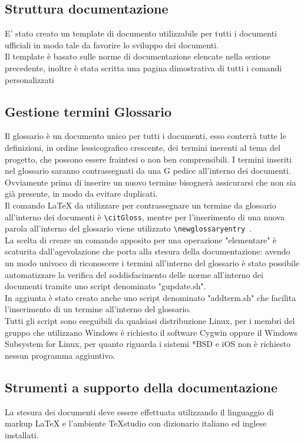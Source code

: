 \documentclass[NormeDiProgetto.tex]{subfiles}
\begin{document}
	\subsection{Struttura documentazione}
	E' stato creato un template di documento utilizzabile per tutti i documenti ufficiali in modo tale da favorire lo sviluppo dei documenti.\\
	Il template è basato sulle norme di documentazione elencate nella sezione precedente, inoltre è stata scritta una pagina dimostrativa di tutti i comandi personalizzati
	
	\subsection{Gestione termini Glossario}
	Il glossario è un documento unico per tutti i documenti, esso conterrà tutte le definizioni, in ordine lessicografico crescente, dei termini inerenti al tema del progetto, che possono essere fraintesi o non ben comprensibili. I termini inseriti nel glossario saranno contrassegnati da una G pedice all'interno dei documenti.\\
	Ovviamente prima di inserire un nuovo termine bisognerà assicurarsi che non sia già presente, in modo da evitare duplicati. \\
	Il comando \LaTeX{}  da utilizzare per contrassegnare un termine da glossario all'interno dei documenti è \texttt{\textbackslash{}citGloss}, mentre per l'inserimento di una nuova parola all'interno del glossario viene utilizzato \texttt{\textbackslash{}newglossaryentry }.\\
	La scelta di creare un comando apposito per una operazione "elementare" è scaturita dall'agevolazione che porta alla stesura della documentazione: avendo un modo univoco di riconoscere i termini all'interno del glossario è stato possibile automatizzare la verifica del soddisfacimento delle norme all'interno dei documenti tramite uno script denominato "gupdate.sh".\\
	In aggiunta è stato creato anche uno script denominato "addterm.sh" che facilita l'inserimento di un termine all'interno del glossario.\\
	Tutti gli script sono eseguibili da qualsiasi distribuzione Linux, per i membri del gruppo che utilizzano Windows è richiesto il software Cygwin oppure il Windows Subsystem for Linux, per quanto riguarda i sistemi *BSD e iOS non è richiesto nessun programma aggiuntivo.
	
	\subsection{Strumenti a supporto della documentazione}
	La stesura dei documenti deve essere effettuata utilizzando il linguaggio di markup \LaTeX{}  e l'ambiente TeXstudio con dizionario italiano ed inglese installati.
	
\end{document}
